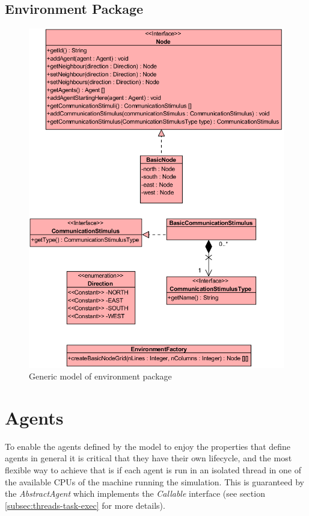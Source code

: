 \subsection{Environment Package}

\begin{figure}[H]
  \centering
  \includegraphics[width=1.0\linewidth]{gfx/uml-env-package.png}
  \caption{Generic model of environment package}
  \label{fig:gen-env-package}
\end{figure}

\section {Agents}
\label{sec:agents}

To enable the agents defined by the model to enjoy the properties that define agents in general it is critical that they have their own lifecycle, and the most flexible way to achieve that is if each agent is run in an isolated thread in one of the available CPUs of the machine running the simulation. This is guaranteed by the \emph{AbstractAgent} which implements the \emph{Callable} interface (see section \ref{subsec:threads-task-exec} for more details).  

